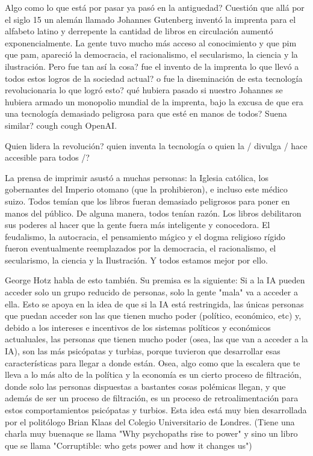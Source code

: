 Algo como lo que está por pasar ya pasó en la antiguedad?
Cuestión que allá por el siglo 15 un alemán llamado Johannes Gutenberg inventó la imprenta para el alfabeto latino y derrepente la cantidad de libros
en circulación aumentó exponencialmente. La gente tuvo mucho más acceso al conocimiento y que pim que pam, 
apareció la democracia, el racionalismo, el secularismo, la ciencia y la ilustración. 
Pero fue tan así la cosa? fue el invento de la imprenta lo que llevó a todos estos logros de la sociedad actual?
o fue la diseminación de esta tecnología revolucionaria lo que logró esto? qué hubiera pasado si nuestro Johannes
se hubiera armado un monopolio mundial de la imprenta, bajo la excusa de que era una tecnología demasiado peligrosa
para que esté en manos de todos?
Suena similar? cough cough OpenAI. 


Quien lidera la revolución? quien inventa la tecnología o quien la / divulga / hace accesible para todos /?



La prensa de imprimir asustó a muchas personas: la Iglesia católica, los gobernantes del Imperio otomano (que la prohibieron), e incluso este médico suizo.
Todos temían que los libros fueran demasiado peligrosos para poner en manos del público.
De alguna manera, todos tenían razón.
Los libros debilitaron sus poderes al hacer que la gente fuera más inteligente y conocedora.
El feudalismo, la autocracia, el pensamiento mágico y el dogma religioso rígido fueron eventualmente reemplazados por la democracia, el racionalismo, el secularismo, la ciencia y la Ilustración.
Y todos estamos mejor por ello.



George Hotz habla de esto también. Su premisa es la siguiente: Si a la IA pueden acceder solo un grupo reducido de personas, 
solo la gente "mala" va a acceder a ella. Esto se apoya en la idea de que si la IA está restringida, las únicas personas
que puedan acceder son las que tienen mucho poder (político, económico, etc) y, debido a los intereses e incentivos de
los sistemas políticos y económicos actualuales, las personas que tienen mucho poder (osea, las que van a acceder a la IA), 
son las más psicópatas y turbias, porque tuvieron que desarrollar esas características para llegar a donde están. Osea, 
algo como que la escalera que te lleva a lo más alto de la política y la economía es un cierto proceso de filtración, 
donde solo las personas dispuestas a bastantes cosas polémicas llegan, y que además de ser un proceso de filtración, 
es un proceso de retroalimentación para estos comportamientos psicópatas y turbios. Esta idea está muy bien desarrollada
por el politólogo Brian Klaas del Colegio Universitario de Londres. (Tiene una charla muy buenaque se llama "Why
psychopaths rise to power" y sino un libro que se llama "Corruptible: who gets power and how it changes us")







